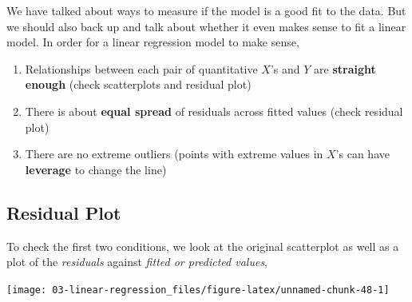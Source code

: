 \documentclass[
]{book}
\newenvironment{Shaded}{\begin{snugshade}}{\end{snugshade}}
\newcommand{\DataTypeTok}[1]{\textcolor[rgb]{0.13,0.29,0.53}{#1}}
\newcommand{\DecValTok}[1]{\textcolor[rgb]{0.00,0.00,0.81}{#1}}
\newcommand{\KeywordTok}[1]{\textcolor[rgb]{0.13,0.29,0.53}{\textbf{#1}}}
\newcommand{\NormalTok}[1]{#1}
\newcommand{\OperatorTok}[1]{\textcolor[rgb]{0.81,0.36,0.00}{\textbf{#1}}}
\newcommand{\OtherTok}[1]{\textcolor[rgb]{0.56,0.35,0.01}{#1}}
\newcommand{\StringTok}[1]{\textcolor[rgb]{0.31,0.60,0.02}{#1}}
\providecommand{\tightlist}{%
  \setlength{\itemsep}{0pt}\setlength{\parskip}{0pt}}
\begin{document}
We have talked about ways to measure if the model is a good fit to the data. But we should also back up and talk about whether it even makes sense to fit a linear model. In order for a linear regression model to make sense,

\begin{enumerate}
\def\labelenumi{\arabic{enumi}.}
\tightlist
\item
  Relationships between each pair of quantitative \(X\)'s and \(Y\) are \textbf{straight enough} (check scatterplots and residual plot)
\item
  There is about \textbf{equal spread} of residuals across fitted values (check residual plot)
\item
  There are no extreme outliers (points with extreme values in \(X\)'s can have \textbf{leverage} to change the line)
\end{enumerate}

\hypertarget{residual-plot}{%
\subsection{Residual Plot}\label{residual-plot}}

To check the first two conditions, we look at the original scatterplot as well as a plot of the \emph{residuals} against \emph{fitted or predicted values},

\begin{Shaded}
\end{Shaded}

\begin{center}\texttt{[image: 03-linear-regression\_files/figure-latex/unnamed-chunk-48-1]} \end{center}
\end{document}
